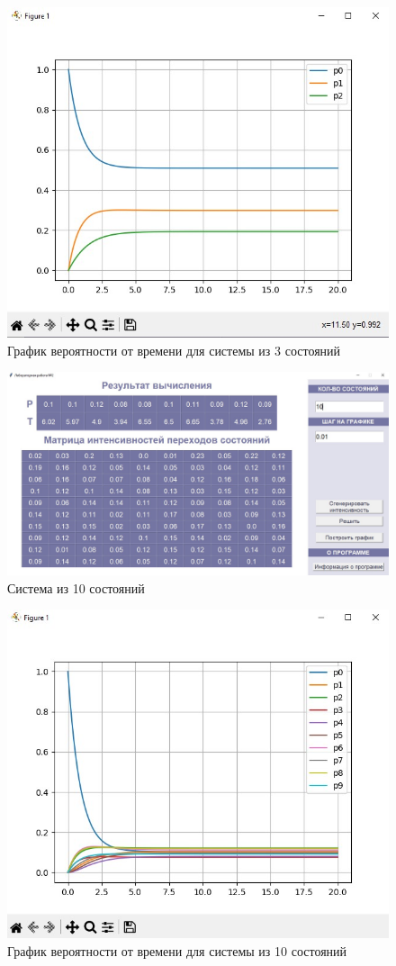 \begin{figure}[h]
    \centering
    \includegraphics[scale = 0.6]{img/3g.jpg}
    \caption{График вероятности от времени для системы из 3 состояний}
    \label{img:graph3}
\end{figure}

\begin{figure}[h]
    \centering
    \includegraphics[scale = 0.4]{img/10.jpg}
    \caption{Система из 10 состояний}
    \label{img:matrix10}
\end{figure}

\begin{figure}[h]
    \centering
    \includegraphics[scale = 0.6]{img/10g.jpg}
    \caption{График вероятности от времени для системы из 10 состояний}
    \label{img:graph10}
\end{figure}